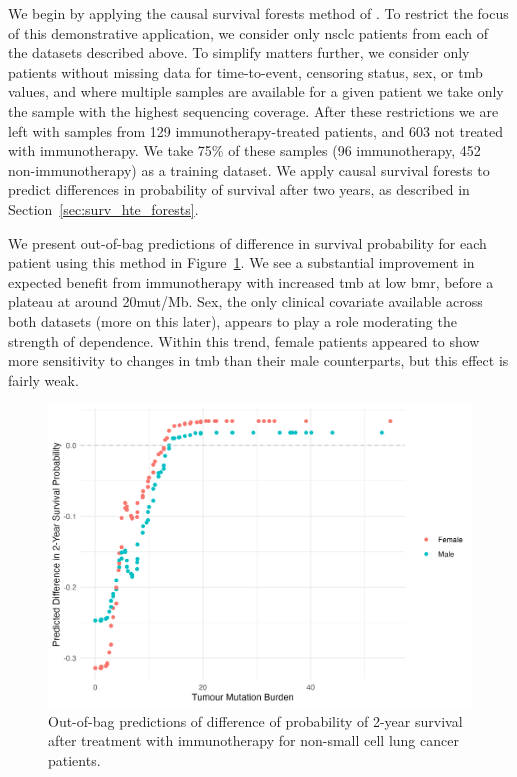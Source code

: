 \documentclass[../thesis.tex]{subfiles}
\begin{document}
We begin by applying the causal survival forests method of \citet{cui_estimating_2022}. To restrict the focus of this demonstrative application, we consider only \gls{nsclc} patients from each of the datasets described above. To simplify matters further, we consider only patients without missing data for time-to-event, censoring status, sex, or \gls{tmb} values, and where multiple samples are available for a given patient we take only the sample with the highest sequencing coverage. After these restrictions we are left with samples from 129 immunotherapy-treated patients, and 603 not treated with immunotherapy. We take 75\% of these samples (96 immunotherapy, 452 non-immunotherapy) as a training dataset. We apply causal survival forests to predict differences in probability of survival after two years, as described in Section~\ref{sec:surv_hte_forests}.

We present out-of-bag predictions of difference in survival probability for each patient using this method in Figure~\ref{fig:immuno_train_samples_hte_predictions}. We see a substantial improvement in expected benefit from immunotherapy with increased \gls{tmb} at low \gls{bmr}, before a plateau at around 20mut/Mb. Sex, the only clinical covariate available across both datasets (more on this later), appears to play a role moderating the strength of dependence. Within this trend, female patients appeared to show more sensitivity to changes in \gls{tmb} than their male counterparts, but this effect is fairly weak. 

\begin{figure}[!tpb] 
\centering
\includegraphics[width=\textwidth]{figures/chapter4/immuno_train_samples_hte_predictions.png}
\caption{Out-of-bag predictions of difference of probability of 2-year survival after treatment with immunotherapy for non-small cell lung cancer patients.  \label{fig:immuno_train_samples_hte_predictions}}
\end{figure}
\end{document}
